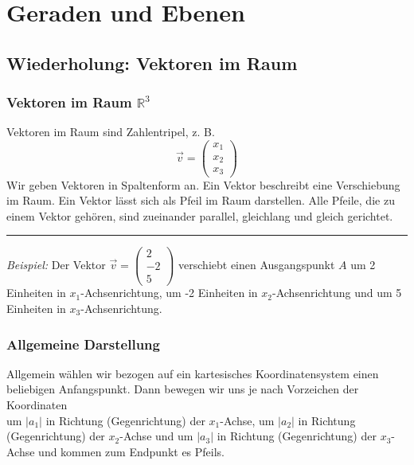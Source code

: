 \chapter{Geraden und Ebenen}
\section{Wiederholung: Vektoren im Raum}

\subsection{Vektoren im Raum $\mathbb{R}^3$}

\begin{definition}
    Vektoren im Raum sind Zahlentripel, z. B. $$\vec{v} = \left(\begin{array}{c} x_1 \\ x_2 \\ x_3 \end{array}\right)$$ Wir geben Vektoren in Spaltenform an. Ein Vektor beschreibt eine Verschiebung im Raum. Ein Vektor lässt sich als Pfeil im Raum darstellen. Alle Pfeile, die zu einem Vektor gehören, sind zueinander parallel, gleichlang und gleich gerichtet.
\end{definition}

\noindent\rule{\textwidth}{1pt}

\textit{Beispiel:} Der Vektor $\vec{v} = \left(\begin{array}{c} 2 \\ -2 \\ 5 \end{array}\right)$ verschiebt einen Ausgangspunkt $A$ um 2 Einheiten in $x_1$-Achsenrichtung, um -2 Einheiten in $x_2$-Achsenrichtung und um 5 Einheiten in $x_3$-Achsenrichtung.

\subsection{Allgemeine Darstellung}

Allgemein wählen wir \textbf{\textendash{}} bezogen auf ein kartesisches Koordinatensystem \textbf{\textendash{}} einen beliebigen Anfangspunkt. Dann bewegen wir uns je nach Vorzeichen der Koordinaten \\[5pt]
um $\left|a_1\right|$ in Richtung (Gegenrichtung) der $x_1$-Achse, um $\left|a_2\right|$ in Richtung (Gegenrichtung) der $x_2$-Achse und um $\left|a_3\right|$ in Richtung (Gegenrichtung) der $x_3$-Achse und kommen zum Endpunkt es Pfeils.

